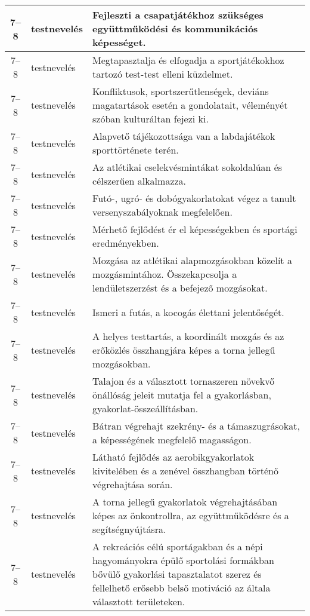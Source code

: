 \begin{small}
\begin{longtable}{c | p{2cm} |  p{11cm} }
              7--8 & testnevelés & Fejleszti a csapatjátékhoz szükséges együttműködési és kommunikációs képességet. \\ \hline
              7--8 & testnevelés & Megtapasztalja és elfogadja a sportjátékokhoz tartozó test-test elleni küzdelmet. \\ \hline
              7--8 & testnevelés & Konfliktusok, sportszerűtlenségek, deviáns magatartások esetén a gondolatait, véleményét szóban kulturáltan fejezi ki. \\ \hline
              7--8 & testnevelés & Alapvető tájékozottsága van a labdajátékok sporttörténete terén. \\ \hline
              7--8 & testnevelés & Az atlétikai cselekvésmintákat sokoldalúan és célszerűen alkalmazza. \\ \hline
              7--8 & testnevelés & Futó-, ugró- és dobógyakorlatokat végez a tanult versenyszabályoknak megfelelően. \\ \hline
              7--8 & testnevelés & Mérhető fejlődést ér el képességekben és sportági eredményekben. \\ \hline
              7--8 & testnevelés & Mozgása az atlétikai alapmozgásokban közelít a mozgásmintához. Összekapcsolja a lendületszerzést és a befejező mozgásokat. \\ \hline
              7--8 & testnevelés & Ismeri a futás, a kocogás élettani jelentőségét. \\ \hline
              7--8 & testnevelés & A helyes testtartás, a koordinált mozgás és az erőközlés összhangjára képes a torna jellegű mozgásokban. \\ \hline
              7--8 & testnevelés & Talajon és a választott tornaszeren növekvő önállóság jeleit mutatja fel a gyakorlásban, gyakorlat-összeállításban. \\ \hline
              7--8 & testnevelés & Bátran végrehajt szekrény- és a támaszugrásokat, a képességének megfelelő magasságon. \\ \hline
              7--8 & testnevelés & Látható fejlődés az aerobikgyakorlatok kivitelében és a zenével összhangban történő végrehajtása során. \\ \hline
              7--8 & testnevelés & A torna jellegű gyakorlatok végrehajtásában képes az önkontrollra, az együttműködésre és a segítségnyújtásra. \\ \hline
              7--8 & testnevelés & A rekreációs célú sportágakban és a népi hagyományokra épülő sportolási formákban bővülő gyakorlási tapasztalatot szerez és fellelhető erősebb belső motiváció az általa választott területeken. \\ \hline

\end{longtable}
\end{small}
